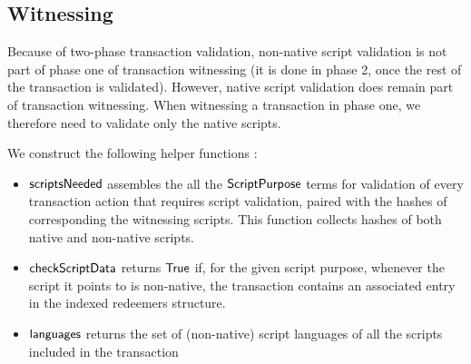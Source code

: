 \subsection{Witnessing}
\label{sec:wits}

Because of two-phase transaction validation, non-native script validation is not part of phase one of transaction witnessing
(it is done in phase 2, once the rest of the transaction is validated).
However, native script validation does remain part of transaction witnessing.
When witnessing a transaction in phase one, we therefore need to validate only the native scripts.

We construct the following helper functions :

\begin{itemize}
  \item $\mathsf{scriptsNeeded}$ assembles the all the $\mathsf{ScriptPurpose}$ terms
  for validation of every transaction action that requires script validation,
  paired with the hashes of corresponding the witnessing scripts.
  This function collects hashes of both native and non-native scripts.

  \item $\mathsf{checkScriptData}$ returns $\mathsf{True}$ if, for the given script purpose,
  whenever the script it points to is non-native, the transaction contains an associated entry
  in the indexed redeemers structure.

  \item $\mathsf{languages}$ returns the set of (non-native) script languages
  of all the scripts included in the transaction
\end{itemize}

